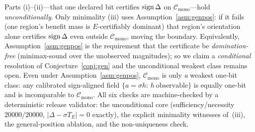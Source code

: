 \begin{remark}\label{rmk:genpos}
Parts (i)--(ii)---that one declared bit certifies $\operatorname{sign}\Delta$ on $\mathcal C_{\mathrm{mono}}$---hold
\emph{unconditionally}. Only minimality (iii) uses Assumption~\ref{asm:genpos}: if it fails (one
region's benefit mass is $E$-certifiably dominant) that region's orientation alone certifies
$\operatorname{sign}\Delta$ even outside $\mathcal C_{\mathrm{mono}}$, moving the boundary. Equivalently,
Assumption~\ref{asm:genpos} is the requirement that the certificate be \emph{domination-free}
(minimax-sound over the unobserved magnitudes); so we claim a \emph{conditional} resolution of
Conjecture~\ref{conj:gen} and the unconditional weakest class remains open. Even under
Assumption~\ref{asm:genpos}, $\mathcal C_{\mathrm{mono}}$ is only \emph{a} weakest one-bit class:
any calibrated sign-aligned field $\{a=\sigma h:\,h\ \text{observable}\}$ is equally one-bit and
is incomparable to $\mathcal C_{\mathrm{mono}}$. All six checks are machine-checked by a
deterministic release validator: the unconditional core (sufficiency/necessity
$20000/20000$, $|\Delta-\sigma T_E|=0$ exactly), the explicit minimality witnesses of~(iii), the
general-position ablation, and the non-uniqueness check.


\end{remark}

